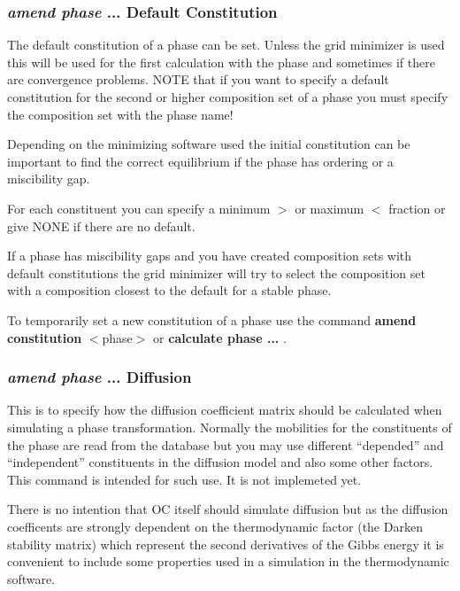 \documentclass[11pt]{article}
\begin{document}
\hypertarget{Amend phase default constit}{}
\subsubsection{{\em amend phase} ... Default Constitution}

The default constitution of a phase can be set.  Unless the grid
minimizer is used this will be used for the first calculation with the
phase and sometimes if there are convergence problems.  NOTE that if
you want to specify a default constitution for the second or higher
composition set of a phase you must specify the composition set with
the phase name!

Depending on the minimizing software used the initial constitution can
be important to find the correct equilibrium if the phase has ordering
or a miscibility gap.

For each constituent you can specify a minimum $>$ or maximum $<$
fraction or give NONE if there are no default.

If a phase has miscibility gaps and you have created composition
sets with default constitutions the grid minimizer will try to select
the composition set with a composition closest to the default for a
stable phase.

To temporarily set a new constitution of a phase use the command {\bf
  amend constitution} $<$phase$>$ or {\bf calculate phase ... }.

\hypertarget{Amend diffusion}{}
\subsubsection{{\em amend phase} ... Diffusion}

This is to specify how the diffusion coefficient matrix should be
calculated when simulating a phase transformation.  Normally the
mobilities for the constituents of the phase are read from the
database but you may use different ``depended'' and ``independent''
constituents in the diffusion model and also some other factors.  This
command is intended for such use.  It is not implemeted yet.

There is no intention that OC itself should simulate diffusion but as
the diffusion coefficents are strongly dependent on the thermodynamic
factor (the Darken stability matrix) which represent the second
derivatives of the Gibbs energy it is convenient to include some
properties used in a simulation in the thermodynamic software.
\end{document}
